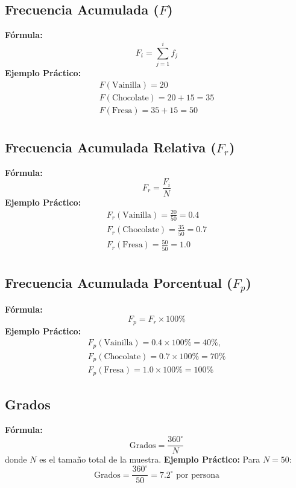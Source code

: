 \documentclass[10pt]{article}
\begin{document}
\begin{multicols}{2}
		
		\subsection*{Frecuencia Acumulada ($F$)}
		\textbf{Fórmula:}
		\[
		F_i = \sum_{j=1}^{i} f_j
		\]
		\textbf{Ejemplo Práctico:}  
		\begin{align*}
			F(\text{Vainilla}) = 20 \\
			F(\text{Chocolate}) = 20 + 15 = 35 \\
			F(\text{Fresa}) = 35 + 15 = 50 \\
		\end{align*}
		
		\subsection*{Frecuencia Acumulada Relativa ($F_r$)}
		\textbf{Fórmula:}
		\[
		F_r = \frac{F_i}{N}
		\]
		\textbf{Ejemplo Práctico:}  
		\begin{align*}
			F_r(\text{Vainilla}) = \frac{20}{50} = 0.4 \\  F_r(\text{Chocolate}) = \frac{35}{50} = 0.7 \\
			F_r(\text{Fresa}) = \frac{50}{50} = 1.0 \\
		\end{align*}
		
		
		
		\subsection*{Frecuencia Acumulada Porcentual ($F_p$)}
		\textbf{Fórmula:}
		\[
		F_p = F_r \times 100\%
		\]
		\textbf{Ejemplo Práctico:}  
		\begin{align*}
			F_p(\text{Vainilla}) = 0.4 \times 100\% = 40\%, \\ F_p(\text{Chocolate}) = 0.7 \times 100\% = 70\% \\ F_p(\text{Fresa}) = 1.0 \times 100\% = 100\%
		\end{align*}
		
		\subsection*{Grados}
		\textbf{Fórmula:}
		\[
		\text{Grados} = \frac{360^\circ}{N}
		\]
		donde \( N \) es el tamaño total de la muestra.
		\textbf{Ejemplo Práctico:}  
		Para \( N = 50 \):
		\[
		\text{Grados} = \frac{360^\circ}{50} = 7.2^\circ \text{ por persona}
		\]
		

\end{multicols}
\end{document}
